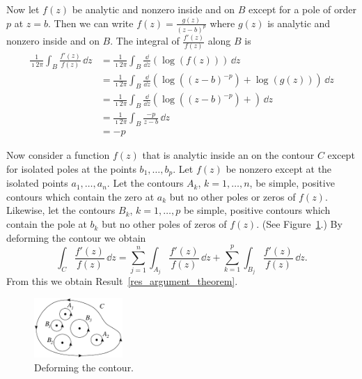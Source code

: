 Now let $f(z)$ be analytic and nonzero inside and on $B$ except for a pole of 
order $p$ at $z = b$.  Then we can write $f(z) = \frac{g(z)}{(z - b)^p}$ 
where $g(z)$ is analytic and nonzero inside and on $B$.  The integral of 
$\frac{f'(z)}{f(z)}$ along $B$ is
\begin{align*}
  \frac{1}{\imath 2 \pi} \int_B \frac{f'(z)}{f(z)}\,\dd z
  &= \frac{1}{\imath 2 \pi} \int_B \frac{\dd}{\dd z} \left( \log(f(z)) \right)
  \,\dd z 
  \\
  &= \frac{1}{\imath 2 \pi} \int_B \frac{\dd}{\dd z} \left( \log((z - b)^{-p}) + 
    \log(g(z)) \right)\,\dd z 
  \\
  &= \frac{1}{\imath 2 \pi} \int_B \frac{\dd}{\dd z} \left( \log((z - b)^{-p}) + 
  \right)\,\dd z 
  \\
  &= \frac{1}{\imath 2 \pi} \int_B \frac{- p}{z - b}\,\dd z 
  \\
  &= - p
\end{align*}



Now consider a function $f(z)$ that is analytic inside an on the contour
$C$ except for isolated poles at the points $b_1, \ldots, b_p$.  Let
$f(z)$ be nonzero except at the isolated points $a_1, \ldots, a_n$.
Let the contours $A_k$, $k=1,\ldots,n$, be simple, positive contours which 
contain the zero at $a_k$ but no other poles or zeros of $f(z)$.  
Likewise, let the contours $B_k$, $k=1,\ldots,p$ be simple, positive contours 
which contain the pole at $b_k$ but no other poles of zeros of $f(z)$.
(See Figure~\ref{ci_argth}.)  By deforming the contour we obtain
\[
\int_C \frac{f'(z)}{f(z)} \,\dd z
= \sum_{j=1}^n \int_{A_j} \frac{f'(z)}{f(z)} \,\dd z
+ \sum_{k=1}^p \int_{B_j} \frac{f'(z)}{f(z)} \,\dd z.
\]
From this we obtain Result~\ref{res_argument_theorem}. 

\begin{figure}[htb!]
  \begin{center}
    \includegraphics[width=0.3\textwidth]{fcv/cauchy/ci_argth}
  \end{center}
  \caption{Deforming the contour.}
  \label{ci_argth}
\end{figure}




